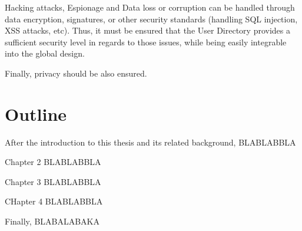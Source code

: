 Hacking attacks, Espionage and Data loss or corruption can be handled through data encryption, signatures, or other security standards (handling SQL injection, XSS attacks, etc). Thus, it must be ensured that the User Directory provides a sufficient security level in regards to those issues, while being easily integrable into the global design. 

Finally, privacy should be also ensured.


\section{Outline}
After the introduction to this thesis and its related background, BLABLABBLA

Chapter 2 BLABLABBLA

Chapter 3 BLABLABBLA

CHapter 4 BLABLABBLA

Finally, BLABALABAKA



